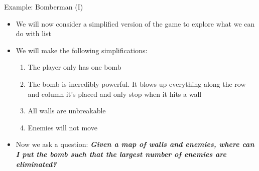 \documentclass[10pt,xcolor={table,dvipsnames},t]{beamer}
\begin{document}
\begin{frame}{Example: Bomberman (I)}
  \begin{itemize}
    \item We will now consider a simplified version of the game to explore what we can do with list
    \item We will make the following simplifications:
    \begin{enumerate}
      \item The player only has one bomb
      \item The bomb is incredibly powerful. It blows up everything along the row and column it's placed and only stop when it hits a wall 
      \item All walls are unbreakable
      \item Enemies will not move
    \end{enumerate}
    \item Now we ask a question: \textbf{\textit{Given a map of walls and enemies, where can I put the bomb such that the largest number of enemies are eliminated?}}
  \end{itemize}
\end{frame}
\end{document}
